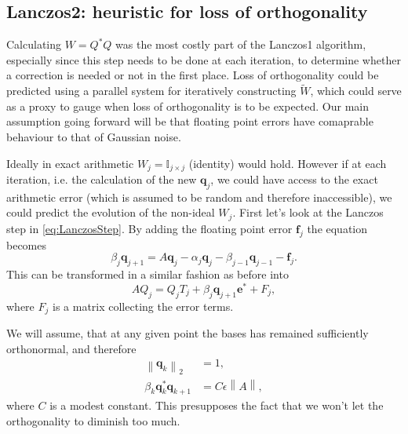 \documentclass{article}
\begin{document}
	\FloatBarrier
	
	\subsection{Lanczos2: heuristic for loss of orthogonality}\label{ssec:lanczos2}
	
	Calculating $W = Q^\ast Q$ was the most costly part of the Lanczos1 algorithm, especially since this step needs to be done at each iteration, to determine whether a correction is needed or not in the first place. Loss of orthogonality could be predicted using a parallel system for iteratively constructing $\tilde{W}$, which could serve as a proxy to gauge when loss of orthogonality is to be expected. Our main assumption going forward will be that floating point errors have comaprable behaviour to that of Gaussian noise.
	
	Ideally in exact arithmetic $W_j = \mathbb{I}_{j\times j}$ (identity) would hold. However if at each iteration, i.e. the calculation of the new $\textbf{q}_j$, we could have access to the exact arithmetic error (which is assumed to be random and therefore inaccessible), we could predict the evolution of the non-ideal $W_j$. First let's look at the Lanczos step in \autoref{eq:LanczosStep}. By adding the floating point error $\textbf{f}_j$
	the equation becomes
	\begin{equation}\label{eq:LanczosStep-f}
		\beta_j\mathbf{q}_{j+1}=A\mathbf{q}_j-\alpha_j\mathbf{q}_j-\beta_{j-1}\mathbf{q}_{j-1} - \textbf{f}_j.
	\end{equation}
	This can be transformed in a similar fashion as before into 
	\begin{equation}\label{eq:matLanczos-F}
		AQ_{j}=Q_jT_j+\beta_{j}\mathbf{q}_{j+1}\mathbf{e}^{\ast} + F_j,
	\end{equation}
	where $F_j$ is a matrix collecting the error terms.
	
	We will assume, that at any given point the bases has remained sufficiently orthonormal, and therefore 
	\begin{align}
		\left\lVert \textbf{q}_k \right\rVert_2 &= 1,\\
		\beta_{k} \textbf{q}_k^\ast \textbf{q}_{k+1} &= C \epsilon \left\lVert A \right\rVert,
	\end{align}
	where $C$ is a modest constant. This presupposes the fact that we won't let the orthogonality to diminish too much.
	
\end{document}
